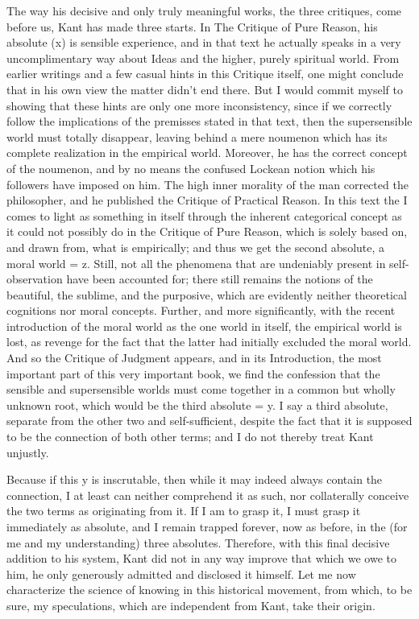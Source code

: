 The way his decisive and only truly meaningful works,
the three critiques, come before us, Kant has made three starts.
In The Critique of Pure Reason, his absolute (x) is sensible experience,
and in that text he actually speaks in a very uncomplimentary way
about Ideas and the higher, purely spiritual world.
From earlier writings and a few casual hints in this Critique itself,
one might conclude that in his own view the matter didn't end there.
But I would commit myself to showing that these hints are
only one more inconsistency, since if we correctly follow
the implications of the premisses stated in that text,
then the supersensible world must totally disappear,
leaving behind a mere noumenon which has its
complete realization in the empirical world.
Moreover, he has the correct concept of the noumenon,
and by no means the confused Lockean notion
which his followers have imposed on him.
The high inner morality of the man corrected the philosopher,
and he published the Critique of Practical Reason.
In this text the I comes to light as something in itself
through the inherent categorical concept
as it could not possibly do in the Critique of Pure Reason,
which is solely based on, and drawn from, what is empirically;
and thus we get the second absolute, a moral world = z.
Still, not all the phenomena that are undeniably present
in self-observation have been accounted for;
there still remains the notions of
the beautiful, the sublime, and the purposive,
which are evidently neither theoretical cognitions nor moral concepts.
Further, and more significantly,
with the recent introduction of
the moral world as the one world in itself,
the empirical world is lost,
as revenge for the fact that
the latter had initially excluded the moral world.
And so the Critique of Judgment appears,
and in its Introduction,
the most important part of this very important book,
we find the confession that the sensible and supersensible worlds
must come together in a common but wholly unknown root,
which would be the third absolute = y.
I say a third absolute, separate from
the other two and self-sufficient,
despite the fact that it is supposed to be
the connection of both other terms;
and I do not thereby treat Kant unjustly.

Because if this y is inscrutable, then while it may indeed always
contain the connection, I at least can neither comprehend it as such,
nor collaterally conceive the two terms as originating from it.
If I am to grasp it, I must grasp it immediately as absolute,
and I remain trapped forever, now as before, in the
(for me and my understanding) three absolutes.
Therefore, with this final decisive addition to his system,
Kant did not in any way improve that which we owe to him,
he only generously admitted and disclosed it himself.
Let me now characterize the science of knowing in this historical movement,
from which, to be sure, my speculations, which are independent from Kant,
take their origin.

